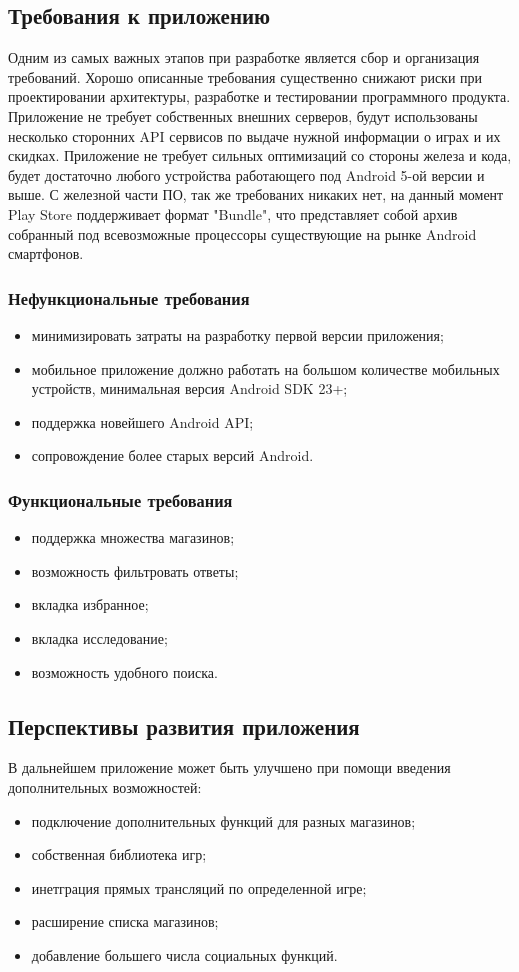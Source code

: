 \subsection{Требования к приложению}
Одним из самых важных этапов при разработке является сбор и организация требований. Хорошо описанные требования существенно снижают риски при проектировании архитектуры, разработке и тестировании программного продукта. Приложение не требует собственных внешних серверов, будут использованы несколько сторонних API сервисов по выдаче нужной информации о играх и их скидках. Приложение не требует сильных оптимизаций со стороны железа и кода, будет достаточно любого устройства работающего под Android 5-ой версии и выше. С железной части ПО, так же требованих никаких нет, на данный момент Play Store поддерживает формат "Bundle", что представляет собой архив собранный под всевозможные процессоры существующие на рынке Android смартфонов. 
 
\subsubsection{Нефункциональные требования}
\begin{itemize}
 \item минимизировать затраты на разработку первой версии приложения;
 \item мобильное приложение должно работать на большом количестве мобильных устройств, минимальная версия Android SDK 23+;
 \item поддержка новейшего Android API;
 \item сопровождение более старых версий Android.
\end{itemize}
 
\subsubsection{Функциональные требования}
\begin{itemize}
  \item поддержка множества магазинов;
  \item возможность фильтровать ответы;
  \item вкладка избранное;
  \item вкладка исследование;
  \item возможность удобного поиска.
\end{itemize}
 
\subsection{Перспективы развития приложения}
В дальнейшем приложение может быть улучшено при помощи введения дополнительных возможностей:
\begin{itemize}
  \item подключение дополнительных функций для разных магазинов;
  \item собственная библиотека игр;
  \item инетграция прямых трансляций по определенной игре;
  \item расширение списка магазинов;
  \item добавление большего числа социальных функций.
\end{itemize}
